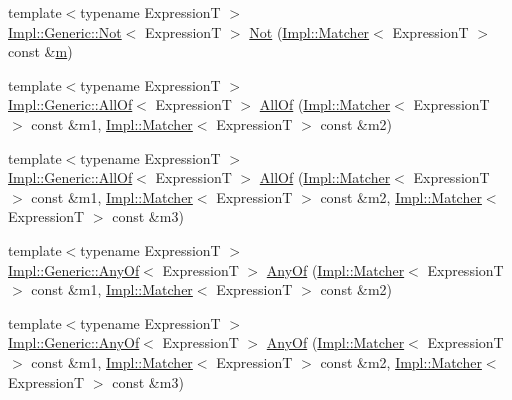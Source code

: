 \begin{DoxyCompactItemize}
\item 
{\footnotesize template$<$typename ExpressionT $>$ }\\\hyperlink{class_catch_1_1_matchers_1_1_impl_1_1_generic_1_1_not}{Impl\+::\+Generic\+::\+Not}$<$ ExpressionT $>$ \hyperlink{namespace_catch_1_1_matchers_ae3c192dc15c973c38f07376d4debdc34}{Not} (\hyperlink{struct_catch_1_1_matchers_1_1_impl_1_1_matcher}{Impl\+::\+Matcher}$<$ ExpressionT $>$ const \&\hyperlink{_s_d_l__opengl__glext_8h_af593500c283bf1a787a6f947f503a5c2}{m})
\item 
{\footnotesize template$<$typename ExpressionT $>$ }\\\hyperlink{class_catch_1_1_matchers_1_1_impl_1_1_generic_1_1_all_of}{Impl\+::\+Generic\+::\+All\+Of}$<$ ExpressionT $>$ \hyperlink{namespace_catch_1_1_matchers_aca6c1c17e137d989583c97f99705797a}{All\+Of} (\hyperlink{struct_catch_1_1_matchers_1_1_impl_1_1_matcher}{Impl\+::\+Matcher}$<$ ExpressionT $>$ const \&m1, \hyperlink{struct_catch_1_1_matchers_1_1_impl_1_1_matcher}{Impl\+::\+Matcher}$<$ ExpressionT $>$ const \&m2)
\item 
{\footnotesize template$<$typename ExpressionT $>$ }\\\hyperlink{class_catch_1_1_matchers_1_1_impl_1_1_generic_1_1_all_of}{Impl\+::\+Generic\+::\+All\+Of}$<$ ExpressionT $>$ \hyperlink{namespace_catch_1_1_matchers_a990366f7d62d10d9752ad7b24230def0}{All\+Of} (\hyperlink{struct_catch_1_1_matchers_1_1_impl_1_1_matcher}{Impl\+::\+Matcher}$<$ ExpressionT $>$ const \&m1, \hyperlink{struct_catch_1_1_matchers_1_1_impl_1_1_matcher}{Impl\+::\+Matcher}$<$ ExpressionT $>$ const \&m2, \hyperlink{struct_catch_1_1_matchers_1_1_impl_1_1_matcher}{Impl\+::\+Matcher}$<$ ExpressionT $>$ const \&m3)
\item 
{\footnotesize template$<$typename ExpressionT $>$ }\\\hyperlink{class_catch_1_1_matchers_1_1_impl_1_1_generic_1_1_any_of}{Impl\+::\+Generic\+::\+Any\+Of}$<$ ExpressionT $>$ \hyperlink{namespace_catch_1_1_matchers_a9cb139c71b9e391d5fc017764695bf84}{Any\+Of} (\hyperlink{struct_catch_1_1_matchers_1_1_impl_1_1_matcher}{Impl\+::\+Matcher}$<$ ExpressionT $>$ const \&m1, \hyperlink{struct_catch_1_1_matchers_1_1_impl_1_1_matcher}{Impl\+::\+Matcher}$<$ ExpressionT $>$ const \&m2)
\item 
{\footnotesize template$<$typename ExpressionT $>$ }\\\hyperlink{class_catch_1_1_matchers_1_1_impl_1_1_generic_1_1_any_of}{Impl\+::\+Generic\+::\+Any\+Of}$<$ ExpressionT $>$ \hyperlink{namespace_catch_1_1_matchers_a8efb0e533db973b8aff1172fb908db02}{Any\+Of} (\hyperlink{struct_catch_1_1_matchers_1_1_impl_1_1_matcher}{Impl\+::\+Matcher}$<$ ExpressionT $>$ const \&m1, \hyperlink{struct_catch_1_1_matchers_1_1_impl_1_1_matcher}{Impl\+::\+Matcher}$<$ ExpressionT $>$ const \&m2, \hyperlink{struct_catch_1_1_matchers_1_1_impl_1_1_matcher}{Impl\+::\+Matcher}$<$ ExpressionT $>$ const \&m3)

\end{DoxyCompactItemize}
